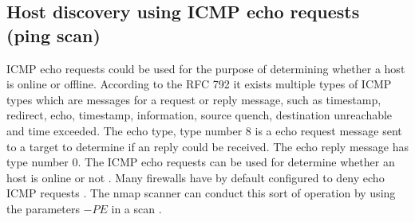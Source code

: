\subsection{Host discovery using ICMP echo requests (ping scan)}
\label{s:ICMPEcho}

ICMP echo requests could be used for the purpose of determining whether a host is online or offline.
According to the RFC 792 \autocite{rfc792} it exists multiple types of ICMP types which are messages for a request or reply message, such as timestamp, redirect, echo, timestamp, information, source quench, destination unreachable and time exceeded.
The echo type, type number 8 is a echo request message sent to a target to determine if an reply could be received. The echo reply message has type number 0. The ICMP echo requests can be used for determine whether an host is online or not \autocite{rfc792, 10.5555/1538595}.
Many firewalls have by default configured to deny echo ICMP requests \autocite{arkin1999network}.
The nmap scanner can conduct this sort of operation by using the parameters $-PE$ in a scan \autocite{10.5555/1538595}.